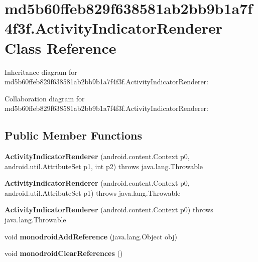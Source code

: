 \hypertarget{classmd5b60ffeb829f638581ab2bb9b1a7f4f3f_1_1_activity_indicator_renderer}{}\section{md5b60ffeb829f638581ab2bb9b1a7f4f3f.\+Activity\+Indicator\+Renderer Class Reference}
\label{classmd5b60ffeb829f638581ab2bb9b1a7f4f3f_1_1_activity_indicator_renderer}


Inheritance diagram for md5b60ffeb829f638581ab2bb9b1a7f4f3f.\+Activity\+Indicator\+Renderer\+:


Collaboration diagram for md5b60ffeb829f638581ab2bb9b1a7f4f3f.\+Activity\+Indicator\+Renderer\+:
\subsection*{Public Member Functions}
\begin{DoxyCompactItemize}
\item 
\mbox{\label{classmd5b60ffeb829f638581ab2bb9b1a7f4f3f_1_1_activity_indicator_renderer_ab2883ac0bdf26e5fa667b0c58010f930}} 
{\bfseries Activity\+Indicator\+Renderer} (android.\+content.\+Context p0, android.\+util.\+Attribute\+Set p1, int p2)  throws java.\+lang.\+Throwable 	
\item 
\mbox{\label{classmd5b60ffeb829f638581ab2bb9b1a7f4f3f_1_1_activity_indicator_renderer_aa9b11b5109e56ef935521245926c51e5}} 
{\bfseries Activity\+Indicator\+Renderer} (android.\+content.\+Context p0, android.\+util.\+Attribute\+Set p1)  throws java.\+lang.\+Throwable 	
\item 
\mbox{\label{classmd5b60ffeb829f638581ab2bb9b1a7f4f3f_1_1_activity_indicator_renderer_a93cc2af35d0f6c5f860f1c04d755eb3e}} 
{\bfseries Activity\+Indicator\+Renderer} (android.\+content.\+Context p0)  throws java.\+lang.\+Throwable 	
\item 
\mbox{\label{classmd5b60ffeb829f638581ab2bb9b1a7f4f3f_1_1_activity_indicator_renderer_a5d56cfc2ee6e98e26f68994067dd0cf2}} 
void {\bfseries monodroid\+Add\+Reference} (java.\+lang.\+Object obj)
\item 
\mbox{\label{classmd5b60ffeb829f638581ab2bb9b1a7f4f3f_1_1_activity_indicator_renderer_a53c663b171496cdee3e0eca02ade7e9d}} 
void {\bfseries monodroid\+Clear\+References} ()
\end{DoxyCompactItemize}
